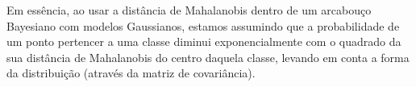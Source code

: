 \documentclass{article}
\begin{document}
Em essência, ao usar a distância de Mahalanobis dentro de um arcabouço Bayesiano com modelos Gaussianos, estamos assumindo que a probabilidade de um ponto pertencer a uma classe diminui exponencialmente com o quadrado da sua distância de Mahalanobis do centro daquela classe, levando em conta a forma da distribuição (através da matriz de covariância).
\end{document}
